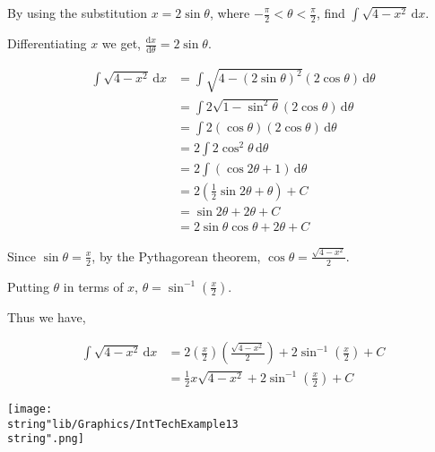 \documentclass[11pt,a4paper]{book}
\begin{document}
\begin{example}

By using the substitution $x=2\sin\theta$, where ${\displaystyle -\frac{\pi}{2}<\theta<\frac{\pi}{2}}$,
find ${\displaystyle \int\sqrt{4-x^{2}}\, \mathrm{d}x}$.

\Solution

Differentiating $x$ we get, ${\displaystyle \frac{ \mathrm{d}x}{ \mathrm{d}\theta}=2\sin\theta}$.

\begin{align*}
{\displaystyle \int\sqrt{4-x^{2}}\, \mathrm{d}x} & ={\displaystyle \int\sqrt{4-\left(2\sin\theta\right)^{2}}\left(2\cos\theta\right)\, \mathrm{d}\theta}\\
 & =\int2\sqrt{1-\sin^{2}\theta}\left(2\cos\theta\right)\, \mathrm{d}\theta\\
 & =\int2\left(\cos\theta\right)\left(2\cos\theta\right)\, \mathrm{d}\theta\\
 & =2\int2\cos^{2}\theta\, \mathrm{d}\theta\\
 & =2\int\left(\cos2\theta+1\right)\, \mathrm{d}\theta\\
 & =2\left(\frac{1}{2}\sin2\theta+\theta\right)+C\\
 & =\sin2\theta+2\theta+C\\
 & =2\sin\theta\cos\theta+2\theta+C
\end{align*}

\begin{minipage}[t]{0.6\textwidth}

Since ${\displaystyle \sin\theta=\frac{x}{2}}$, by the Pythagorean
theorem, ${\displaystyle \cos\theta=\frac{\sqrt{4-x^{2}}}{2}}$.

Putting $\theta$ in terms of $x$, ${\displaystyle \theta=\sin^{-1}\left(\frac{x}{2}\right)}$.

Thus we have,

\begin{align*}
{\displaystyle \int\sqrt{4-x^{2}}\, \mathrm{d}x} & ={\displaystyle 2\left(\frac{x}{2}\right)\left(\frac{\sqrt{4-x^{2}}}{2}\right)+2\sin^{-1}\left(\frac{x}{2}\right)+C}\\
 & =\frac{1}{2}x\sqrt{4-x^{2}}+2\sin^{-1}\left(\frac{x}{2}\right)+C
\end{align*}

\end{minipage}
\begin{minipage}[t]{0.4\textwidth}
\begin{center}
\texttt{[image: \\string"lib/Graphics/IntTechExample13\\string".png]}
\par\end{center}

\end{minipage}

\end{example}
\end{document}
